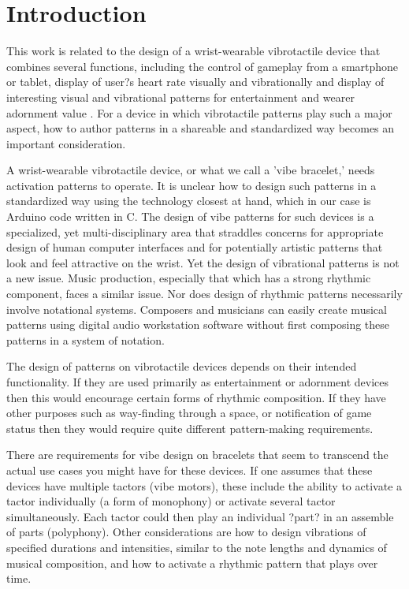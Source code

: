 \documentclass[a4paper, twocolumn]{article}
\begin{document}
\section{Introduction}
This work is related to the design of a wrist-wearable vibrotactile device that combines several functions, including the control of gameplay from a smartphone or tablet, display of user?s heart rate visually and vibrationally and display of interesting visual and vibrational patterns for entertainment and wearer adornment value \cite{tindale2014wearable}. For a device in which vibrotactile patterns play such a major aspect, how to author patterns in a shareable and standardized way becomes an important consideration. 

A wrist-wearable vibrotactile device, or what we call a 'vibe bracelet,' needs activation patterns to operate. It is unclear how to design such patterns in a standardized way using the technology closest at hand, which in our case is Arduino code written in C. The design of vibe patterns for such devices is a specialized, yet multi-disciplinary area that straddles concerns for appropriate design of human computer interfaces and for potentially artistic patterns that look and feel attractive on the wrist. Yet the design of vibrational patterns is not a new issue. Music production, especially that which has a strong rhythmic component, faces a similar issue. Nor does design of rhythmic patterns necessarily involve notational systems. Composers and musicians can easily create musical patterns using digital audio workstation software without first composing these patterns in a system of notation. 

The design of patterns on vibrotactile devices depends on their intended functionality. If they are used primarily as entertainment or adornment devices then this would encourage certain forms of rhythmic composition. If they have other purposes such as way-finding through a space, or notification of game status then they would require quite different pattern-making requirements. 

There are requirements for vibe design on bracelets that seem to transcend the actual use cases you might have for these devices. If one assumes that these devices have multiple tactors (vibe motors), these include the ability to activate a tactor individually (a form of monophony) or activate several tactor simultaneously. Each tactor could then play an individual ?part? in an assemble of parts (polyphony). Other considerations are how to design vibrations of specified durations and intensities, similar to the note lengths and dynamics of musical composition, and how to activate a rhythmic pattern that plays over time. 
\end{document}
